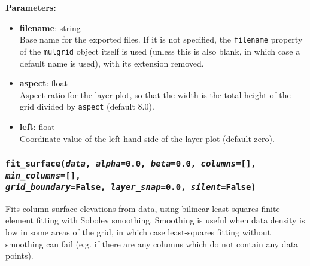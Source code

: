 \textbf{Parameters:}
\begin{itemize}
\item \textbf{filename}: string\\
  Base name for the exported files.  If it is not specified, the \texttt{filename} property of the \texttt{mulgrid} object itself is used (unless this is also blank, in which case a default name is used), with its extension removed.
\item \textbf{aspect}: float\\
  Aspect ratio for the layer plot, so that the width is the total height of the grid divided by \texttt{aspect} (default 8.0).
\item \textbf{left}: float\\
  Coordinate value of the left hand side of the layer plot (default zero).
\end{itemize}

\subsubsection{\texttt{fit\_surface(\emph{data}, \emph{alpha}=0.0, \emph{beta}=0.0, \emph{columns}=[], \emph{min\_columns}=[], \\
    \emph{grid\_boundary}=False, \emph{layer\_snap}=0.0, \emph{silent}=False)}}
\label{sec:fit_surface}

Fits column surface elevations from data, using bilinear least-squares finite element fitting with Sobolev smoothing.  Smoothing is useful when data density is low in some areas of the grid, in which case least-squares fitting without smoothing can fail (e.g. if there are any columns which do not contain any data points).

